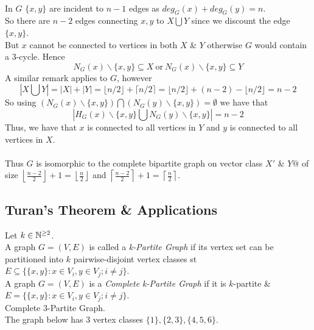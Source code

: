 \documentclass[11pt,a4paper]{article}
\begin{document}
\\
In $G$ $\{x,y\}$ are incident to $n-1$ edges as $deg_G(x)+deg_G(y)=n$.\\
So there are $n-2$ edges connecting $x,y$ to $X\bigcup Y$ since we discount the edge $\{x,y\}$.\\
But $x$ cannot be connected to vertices in both $X$ \& $Y$ otherwise $G$ would contain a $3$-cycle. Hence
$$N_G(x)\backslash\{x,y\}\subseteq X\ \mathrm{or}\ N_G(x)\backslash\{x,y\}\subseteq Y$$
A similar remark applies to $G$, however
$$|X\bigcup Y|=|X|+|Y|=\lfloor n/2\rfloor+\lceil n/2\rceil=\lfloor n/2\rfloor+(n-2)-\lfloor n/2\rfloor=n-2$$
So using $(N_G(x)\backslash\{x,y\})\bigcap(N_G(y)\backslash\{x,y\})=\emptyset$ we have that
$$|H_G(x)\backslash\{x,y\}\bigcup N_G(y)\backslash\{x,y\}|=n-2$$
Thus, we have that $x$ is connected to all vertices in $Y$ and $y$ is connected to all vertices in $X$.\\
\\
Thus $G$ is isomorphic to the complete bipartite graph on vector class $X'$ \& $Y@$ of size $\left\lfloor\frac{n-2}{2}\right\rfloor+1=\left\lfloor\frac{n}{2}\right\rfloor$ and $\left\lceil\frac{n-2}{2}\right\rceil+1=\left\lceil\frac{n}{2}\right\rceil$.

\subsection{Turan's Theorem \& Applications}

Let $k\in\mathbb{N}^{\geq2}$.\\
A graph $G=(V,E)$ is called a \textit{k-Partite Graph} if its vertex set can be partitioned into $k$ pairwise-disjoint vertex classes st $E\subseteq\{\{x,y\}:x\in V_i,y\in V_j; i\neq j\}$.\\

A graph $G=(V,E)$ is a \textit{Complete k-Partite Graph} if it is $k$-partite \& $E=\{\{x,y\}:x\in V_i,y\in V_j; i\neq j\}$.\\

Complete $3$-Partite Graph.\\
The graph below has $3$ vertex classes $\{1\},\{2,3\},\{4,5,6\}$.\\
\end{document}
